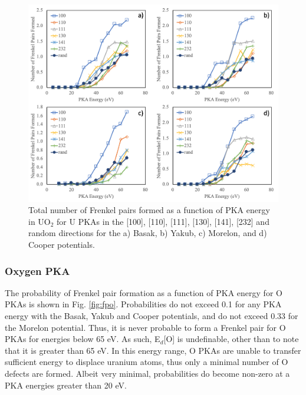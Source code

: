 \documentclass[review]{elsarticle}
\begin{document}
\begin{figure}[h]
 \centering
 \includegraphics[width=1.0\textwidth]{FP_UN.png}
 \caption{Total number of Frenkel pairs formed as a function of PKA energy in UO$_2$ for U PKAs in the [100], [110], [111], [130], [141], [232] and random directions for the a) Basak, b) Yakub, c) Morelon, and d) Cooper potentials. }
 \label{fig:fpun}
\end{figure}

\FloatBarrier

\subsubsection{Oxygen PKA}

The probability of Frenkel pair formation as a function of PKA energy for O PKAs is shown in Fig. \ref{fig:fpo}. Probabilities do not exceed 0.1 for any PKA energy with the Basak, Yakub and Cooper potentials, and do not exceed 0.33 for the Morelon potential. Thus, it is never probable to form a Frenkel pair for O PKAs for energies below 65 eV. As such, E$_d$[O] is undefinable, other than to note that it is greater than 65 eV. In this energy range, O PKAs are unable to transfer sufficient energy to displace uranium atoms, thus only a minimal number of O defects are formed. Albeit very minimal, probabilities do become non-zero at a PKA energies greater than 20 eV.
\end{document}
